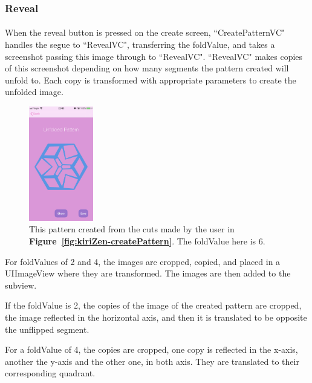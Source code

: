 \documentclass[11pt]{article}
\begin{document}
    \subsubsection{Reveal}
            \paragraph{}
            When the reveal button is pressed on the create screen, ``CreatePatternVC" handles the segue to ``RevealVC", transferring the foldValue, and takes a screenshot passing this image through to ``RevealVC". ``RevealVC" makes copies of this screenshot depending on how many segments the pattern created will unfold to. Each copy is transformed with appropriate parameters to create the unfolded image.  
            
            \begin{figure}
                        \centering
                        \includegraphics[width=0.25\textwidth]{KiriZen/createUnfoldedPattern}
                        \caption{This pattern created from the cuts made by the user in \textbf{Figure~\ref{fig:kiriZen-createPattern}}. The foldValue here is 6.}
                        \label{fig:kiriZen-createUnfoldedPattern}
                    \end{figure}
            
            For foldValues of 2 and 4, the images are cropped, copied, and placed in a UIImageView where they are transformed. The images are then added to the subview. 
            
            If the foldValue is 2, the copies of the image of the created pattern are cropped, the image reflected in the horizontal axis, and then it is translated to be opposite the unflipped segment. 
            
            For a foldValue of 4, the copies are cropped, one copy is reflected in the x-axis, another the y-axis and the other one, in both axis. They are translated to their corresponding quadrant. 
                    
\end{document}
